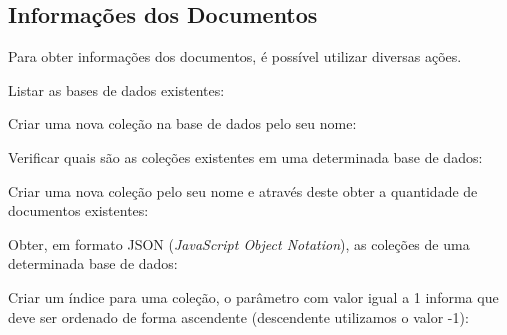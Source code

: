 \subsection{Informações dos Documentos}
Para obter informações dos documentos, é possível utilizar diversas ações. 

Listar as bases de dados existentes: \\

Criar uma nova coleção na base de dados pelo seu nome: \\

Verificar quais são as coleções existentes em uma determinada base de dados: \\

Criar uma nova coleção pelo seu nome e através deste obter a quantidade de documentos existentes: \\

Obter, em formato JSON (\textit{JavaScript Object Notation}), as coleções de uma determinada base de dados: \\

Criar um índice para uma coleção, o parâmetro com valor igual a 1 informa que deve ser ordenado de forma ascendente (descendente utilizamos o valor -1): \\

